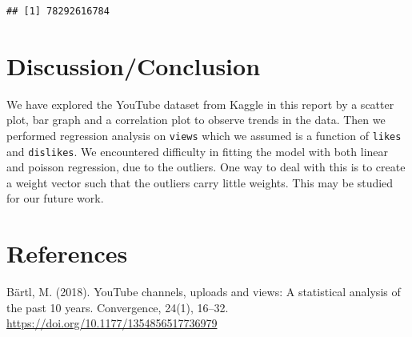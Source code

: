 \documentclass[]{article}
\begin{document}
\begin{verbatim}
## [1] 78292616784
\end{verbatim}

\hypertarget{discussionconclusion}{%
\section{Discussion/Conclusion}\label{discussionconclusion}}

We have explored the YouTube dataset from Kaggle in this report by a
scatter plot, bar graph and a correlation plot to observe trends in the
data. Then we performed regression analysis on \texttt{views} which we
assumed is a function of \texttt{likes} and \texttt{dislikes}. We
encountered difficulty in fitting the model with both linear and poisson
regression, due to the outliers. One way to deal with this is to create
a weight vector such that the outliers carry little weights. This may be
studied for our future work.

\hypertarget{references}{%
\section{References}\label{references}}

Bärtl, M. (2018). YouTube channels, uploads and views: A statistical
analysis of the past 10 years. Convergence, 24(1), 16--32.
\url{https://doi.org/10.1177/1354856517736979}
\end{document}
